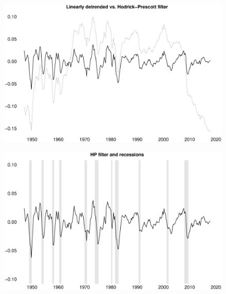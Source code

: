 \documentclass{beamer}
\begin{document}
\begin{frame}
  \begin{figure}
    \includegraphics[scale=.3]{hp_filter.eps}
  \end{figure}
\end{frame}

\begin{frame}
  \begin{figure}
    \includegraphics[scale=.3]{hp_filter2.eps}
  \end{figure}
\end{frame}
\end{document}
